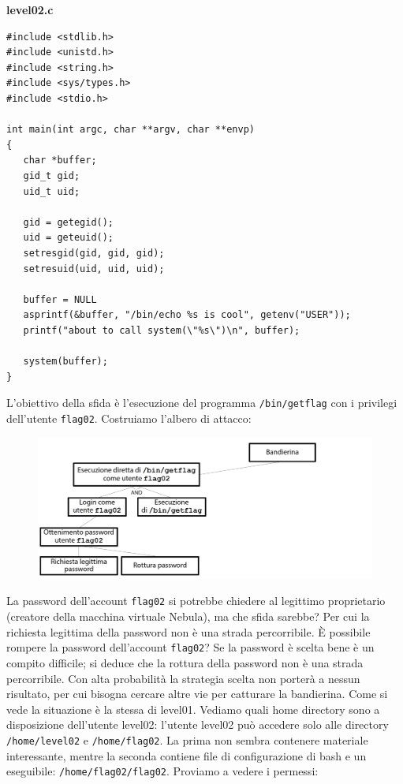 \begin{mdframed}[backgroundcolor=white!20,shadow=false]
\textbf{level02.c}
\begin{verbatim}
#include <stdlib.h>
#include <unistd.h>
#include <string.h>
#include <sys/types.h>
#include <stdio.h>

int main(int argc, char **argv, char **envp)
{
   char *buffer;
   gid_t gid;
   uid_t uid;
   
   gid = getegid();
   uid = geteuid();
   setresgid(gid, gid, gid);
   setresuid(uid, uid, uid);
   
   buffer = NULL
   asprintf(&buffer, "/bin/echo %s is cool", getenv("USER"));
   printf("about to call system(\"%s\")\n", buffer);

   system(buffer);
}
\end{verbatim}
\end{mdframed}
L'obiettivo della sfida è l'esecuzione del
programma \texttt{/bin/getflag} con i privilegi
dell'utente \texttt{flag02}. Costruiamo l'albero di attacco:

\begin{figure}[hbpt!]
    \centering
    \includegraphics[width=0.8 \textwidth]{./Images/cap5/5.6.png}
\end{figure}
\FloatBarrier
 
La password dell'account \texttt{flag02} si potrebbe chiedere al legittimo proprietario (creatore della macchina virtuale Nebula), ma che sfida sarebbe? Per cui la richiesta legittima della password non è una strada percorribile. È possibile rompere la password dell'account \texttt{flag02}? Se la password è scelta bene è un compito difficile; si deduce che la rottura della password non è una strada percorribile. Con alta probabilità la strategia scelta non porterà a nessun risultato, per cui bisogna cercare altre vie per catturare la bandierina. Come si vede la situazione è la stessa di level01. Vediamo quali home directory sono a disposizione dell'utente level02: l'utente level02 può accedere solo alle directory \texttt{/home/level02} e \texttt{/home/flag02}. La prima non sembra contenere materiale interessante, mentre la seconda contiene file di configurazione di bash e un eseguibile: \texttt{/home/flag02/flag02}. Proviamo a vedere i permessi:

